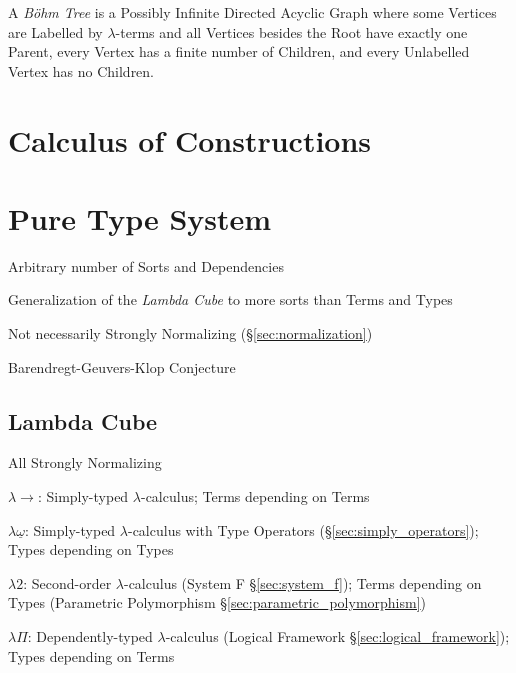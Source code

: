 A \emph{B\"ohm Tree} is a Possibly Infinite Directed Acyclic Graph
where some Vertices are Labelled by $\lambda$-terms and all Vertices
besides the Root have exactly one Parent, every Vertex has a finite
number of Children, and every Unlabelled Vertex has no Children.



\section{Calculus of Constructions}\label{sec:coq}

\section{Pure Type System}\label{sec:pure_type_system}

Arbitrary number of Sorts and Dependencies

Generalization of the \emph{Lambda Cube} to more sorts than Terms and
Types

Not necessarily Strongly Normalizing (\S\ref{sec:normalization})

Barendregt-Geuvers-Klop Conjecture



\subsection{Lambda Cube}\label{sec:lambda_cube}

All Strongly Normalizing

$\lambda\rightarrow$: Simply-typed $\lambda$-calculus; Terms depending
on Terms

$\lambda\underline{\omega}$: Simply-typed $\lambda$-calculus with Type
Operators (\S\ref{sec:simply_operators}); Types depending on Types

$\lambda2$: Second-order $\lambda$-calculus (System F
\S\ref{sec:system_f}); Terms depending on Types (Parametric
Polymorphism \S\ref{sec:parametric_polymorphism})

$\lambda\Pi$: Dependently-typed $\lambda$-calculus
(Logical Framework \S\ref{sec:logical_framework}); Types depending on
Terms



